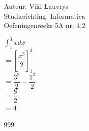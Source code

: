 \documentclass[a4paper]{article}
\begin{document}
  
\noindent \large Auteur: Viki	Lauvrys \\
\noindent \large Studierichting: Informatica\\
\noindent \large Oefeningenreeks 5A nr. 4.2\\

\medskip

\normalsize

$ \displaystyle\int^3_1 x dx $ \\

$ = \left[ \dfrac{x^2}{2} \right]^3_1 $ \\

$ = \dfrac{3^2}{2} - \dfrac{1^2}{2} $ \\

$ = \dfrac{8}{2} $ \\

$ = 4 $ \\


\begin{thebibliography}{999}
\end{thebibliography}
\end{document}
